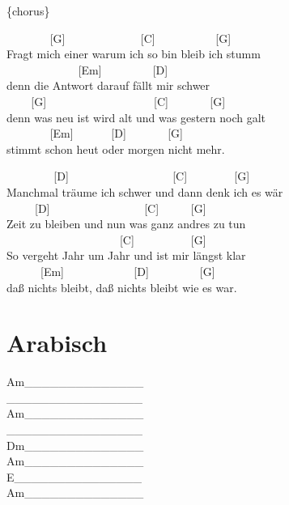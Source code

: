 \documentclass[
  letterpaper,
]{scrbook}
\begin{document}
\{chorus\}

~ ~ ~ ~ ~{[}G{]} ~ ~ ~ ~ ~ ~ ~ ~{[}C{]} ~ ~ ~ ~ ~ ~ {[}G{]}\\
Fragt mich einer warum ich so bin bleib ich stumm\\
\hspace*{0.333em} ~ ~ ~ ~ ~ ~ ~ ~{[}Em{]} ~ ~ ~ ~ ~ {[}D{]}\\
denn die Antwort darauf fällt mir schwer\\
\hspace*{0.333em} ~ ~ ~{[}G{]} ~ ~ ~ ~ ~ ~ ~ ~ ~ ~ ~ {[}C{]} ~ ~ ~ ~
{[}G{]}\\
denn was neu ist wird alt und was gestern noch galt\\
\hspace*{0.333em} ~ ~ ~ ~ ~{[}Em{]} ~ ~ ~ ~{[}D{]} ~ ~ ~ ~ {[}G{]}\\
stimmt schon heut oder morgen nicht mehr.

~ ~ ~ ~ ~ {[}D{]} ~ ~ ~ ~ ~ ~ ~ ~ ~ ~ ~{[}C{]} ~ ~ ~ ~ ~{[}G{]}\\
Manchmal träume ich schwer und dann denk ich es wär\\
\hspace*{0.333em} ~ ~ ~ {[}D{]} ~ ~ ~ ~ ~ ~ ~ ~ ~ ~{[}C{]} ~ ~ ~
{[}G{]}\\
Zeit zu bleiben und nun was ganz andres zu tun\\
\hspace*{0.333em} ~ ~ ~ ~ ~ ~ ~ ~ ~ ~ ~ ~ {[}C{]} ~ ~ ~ ~ ~ ~{[}G{]}\\
So vergeht Jahr um Jahr und ist mir längst klar\\
\hspace*{0.333em} ~ ~ ~ ~{[}Em{]} ~ ~ ~ ~ ~ ~ ~ {[}D{]} ~ ~ ~ ~ ~
{[}G{]}\\
daß nichts bleibt, daß nichts bleibt wie es war.

\hypertarget{arabisch}{%
\chapter{Arabisch}\label{arabisch}}

\textbar Am\_\_\_\_\_\_\textbar\_\_\_\_\_\_\_\_\textbar{}\\
\textbar\_\_\_\_\_\_\_\_\textbar\_\_\_\_\_\_\_\_\textbar{}\\
\textbar Am\_\_\_\_\_\_\textbar\_\_\_\_\_\_\_\_\textbar{}\\
\textbar\_\_\_\_\_\_\_\_\textbar\_\_\_\_\_\_\_\_\textbar{}\\
\textbar Dm\_\_\_\_\_\_\textbar\_\_\_\_\_\_\_\_\textbar{}\\
\textbar Am\_\_\_\_\_\_\textbar\_\_\_\_\_\_\_\_\textbar{}\\
\textbar E\_\_\_\_\_\_\_\textbar\_\_\_\_\_\_\_\_\textbar{}\\
\textbar Am\_\_\_\_\_\_\textbar\_\_\_\_\_\_\_\_\textbar{}
\end{document}
